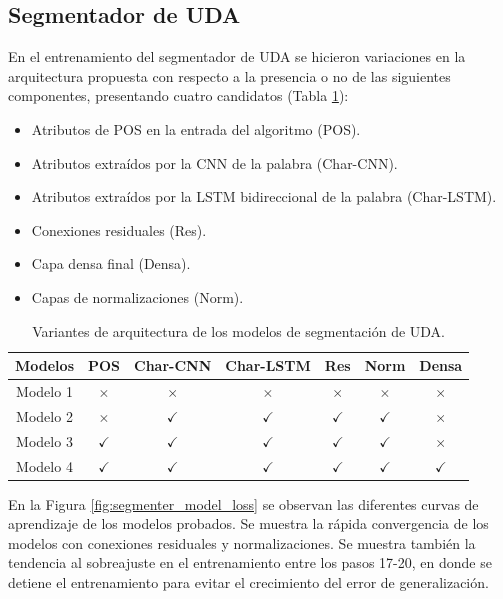 \subsection{Segmentador de UDA}

En el entrenamiento del segmentador de UDA se hicieron variaciones en la arquitectura propuesta con respecto a la
presencia o no de las siguientes componentes, presentando cuatro candidatos (Tabla \ref{table:segmenter_architecture_table}):

\begin{itemize}
    \item Atributos de POS en la entrada del algoritmo (POS).
    \item Atributos extraídos por la CNN de la palabra (Char-CNN).
    \item Atributos extraídos por la LSTM bidireccional de la palabra (Char-LSTM).
    \item Conexiones residuales (Res).
    \item Capa densa final (Densa).
    \item Capas de normalizaciones (Norm).
\end{itemize}

\begin{table}[h!]
	\begin{center}
		\begin{tabular}{|c|c|c|c|c|c|c|} \hline
		Modelos 		& POS       & Char-CNN  & Char-LSTM & Res       & Norm      & Densa  \\ \hline
		Modelo 1		& $\times$	& $\times$    & $\times$    & $\times$	& $\times$    & $\times$ \\ \hline
		Modelo 2		& $\times$	& $\checkmark$    & $\checkmark$    & $\checkmark$	& $\checkmark$    & $\times$ \\ \hline
		Modelo 3		& $\checkmark$	& $\checkmark$    & $\checkmark$    & $\checkmark$	& $\checkmark$    & $\times$ \\ \hline
		Modelo 4		& $\checkmark$	& $\checkmark$    & $\checkmark$    & $\checkmark$	& $\checkmark$    & $\checkmark$ \\ \hline
		\end{tabular}
	\caption{Variantes de arquitectura de los modelos de segmentación de UDA.}\label{table:segmenter_architecture_table}
	\end{center}
\end{table}

En la Figura \ref{fig:segmenter_model_loss} se observan las diferentes curvas de aprendizaje de los modelos 
probados. Se muestra la rápida convergencia de los modelos con conexiones residuales y normalizaciones.
Se muestra también la tendencia al sobreajuste en el entrenamiento entre los pasos 17-20, en donde se detiene el 
entrenamiento para evitar el crecimiento del error de generalización.

